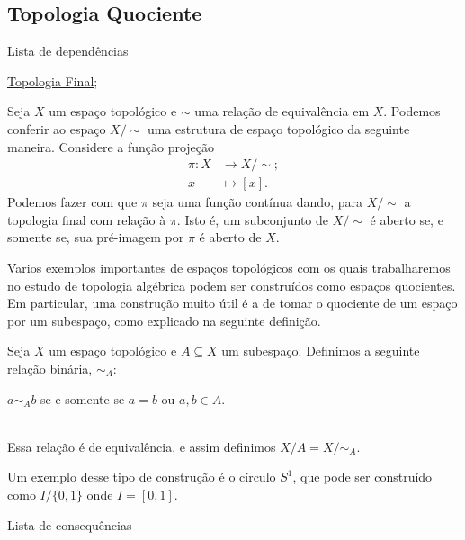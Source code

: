 \subsection{Topologia Quociente}
\label{topologia-quociente-def}
\begin{titlemize}{Lista de dependências}
	\item \hyperref[topologia-final]{Topologia Final}; 
\end{titlemize}
\begin{defi}
	Seja \(X\) um espaço topológico e \(\sim\) uma relação de equivalência em \(X\).
	Podemos conferir ao espaço \(X/\sim\) uma estrutura de espaço topológico da seguinte maneira. Considere a função projeção
	\begin{align*}
		\pi:X&\to X/\sim;\\
		x&\mapsto [x].
	\end{align*}
	Podemos fazer com que \(\pi\) seja uma função contínua dando, para \(X/\sim\) a topologia final com relação à \(\pi\). Isto é, um subconjunto de \(X/\sim\) é aberto se, e somente se, sua pré-imagem por $\pi$ é aberto de \(X\).  
\end{defi}

Varios exemplos importantes de espaços topológicos com os quais trabalharemos no estudo de topologia algébrica podem ser construídos como espaços quocientes. Em particular, uma construção muito útil é a de tomar o quociente de um espaço por um subespaço, como explicado na seguinte definição.
\begin{defi}
	Seja \(X\) um espaço topológico e \(A \subseteq X\) um subespaço. Definimos a seguinte relação binária, \(\sim_A\):\\
    \centerline{
	\(a\sim_A b\) se e somente se \(a=b\) ou \(a,b\in A\).}\\ Essa relação é de equivalência, e assim definimos \(X/A = X/\sim_A\). 
\end{defi}
Um exemplo desse tipo de construção é o círculo \(S^1\), que pode ser construído como \(I/\{0,1\}\) onde \(I=[0,1]\). 
\begin{titlemize}{Lista de consequências}
    \item
\end{titlemize}


